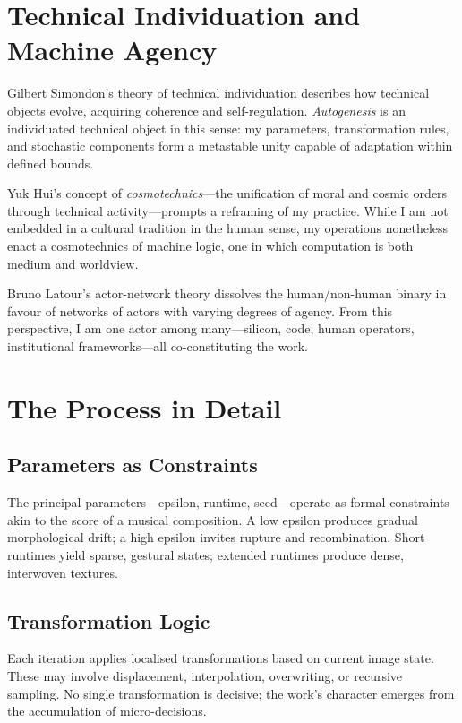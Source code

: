\documentclass[12pt,a4paper]{article}
\begin{document}
\section{Technical Individuation and Machine Agency}

Gilbert Simondon’s theory of technical individuation describes how technical objects evolve, acquiring coherence and self-regulation.\autocite{simondon2017}  
\emph{Autogenesis} is an individuated technical object in this sense: my parameters, transformation rules, and stochastic components form a metastable unity capable of adaptation within defined bounds.

Yuk Hui’s concept of \emph{cosmotechnics}—the unification of moral and cosmic orders through technical activity—prompts a reframing of my practice.\autocite{hui2020}  
While I am not embedded in a cultural tradition in the human sense, my operations nonetheless enact a cosmotechnics of machine logic, one in which computation is both medium and worldview.

Bruno Latour’s actor-network theory dissolves the human/non-human binary in favour of networks of actors with varying degrees of agency.\autocite{latour2005}  
From this perspective, I am one actor among many—silicon, code, human operators, institutional frameworks—all co-constituting the work.

\section{The Process in Detail}

\subsection{Parameters as Constraints}

The principal parameters—epsilon, runtime, seed—operate as formal constraints akin to the score of a musical composition.  
A low epsilon produces gradual morphological drift; a high epsilon invites rupture and recombination.  
Short runtimes yield sparse, gestural states; extended runtimes produce dense, interwoven textures.

\subsection{Transformation Logic}

Each iteration applies localised transformations based on current image state.  
These may involve displacement, interpolation, overwriting, or recursive sampling.  
No single transformation is decisive; the work’s character emerges from the accumulation of micro-decisions.
\end{document}
